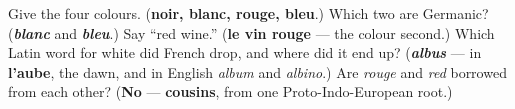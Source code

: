 \begin{tcolorbox}[breakable,colback=teal!4,colframe=teal!35!black,title={Before you move on}]
Give the four colours. (\textbf{noir, blanc, rouge, bleu}.) Which two are Germanic? (\emph{\textbf{blanc}} and \emph{\textbf{bleu}}.) Say \textquotedblleft{}red wine.\textquotedblright{} (\textbf{le vin rouge} — the colour second.) Which Latin word for white did French drop, and where did it end up? (\emph{\textbf{albus}} — in \textbf{l'aube}, the dawn, and in English \emph{album} and \emph{albino}.) Are \emph{rouge} and \emph{red} borrowed from each other? (\textbf{No} — \textbf{cousins}, from one Proto-Indo-European root.)
\end{tcolorbox}
